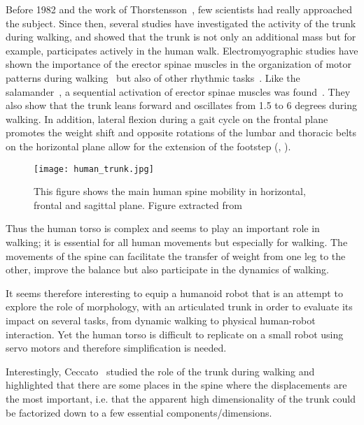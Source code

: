 Before 1982 and the work of Thorstensson~\parencite{thorstensson1982lumbar}, few scientists had really approached the subject. Since then, several studies have investigated the activity of the trunk during walking, and showed that the trunk is not only an additional mass but for example, participates actively in the human walk.
Electromyographic studies have shown the importance of the erector spinae muscles in the organization of motor patterns during walking~\parencite{anders2007trunk} but also of other rhythmic tasks~\parencite{de2008sequential}. Like the salamander~\parencite{ijspeert2007swimming}, a sequential activation of erector spinae muscles was found~\parencite{prince1994anticipatory}.
They also show that the trunk leans forward and oscillates from 1.5 to 6 degrees during walking. In addition, lateral flexion during a gait cycle on the frontal plane promotes the weight shift and opposite rotations of the lumbar and thoracic belts on the horizontal plane allow for the extension of the footstep (\cite{feipel2001three}, \cite{lamoth2006effects}).

\begin{figure}[ht]
    \begin{center}
        \texttt{[image: human\_trunk.jpg]}
    \end{center}
    \caption{This figure shows the main human spine mobility in horizontal, frontal and sagittal plane. Figure extracted from~\parencite{ceccatoPlos09}}
    \label{fig:human_spine_system}
\end{figure}

Thus the human torso is complex and seems to play an important role in walking; it is essential for all human movements but especially for walking. The movements of the spine can facilitate the transfer of weight from one leg to the other, improve the balance but also participate in the dynamics of walking.

It seems therefore interesting to equip a humanoid robot that is an attempt to explore the role of morphology, with an articulated trunk in order to evaluate its impact on several tasks, from dynamic walking to physical human-robot interaction. Yet the human torso is difficult to replicate on a small robot using servo motors and therefore simplification is needed.

Interestingly, Ceccato~\parencite{ceccatoPlos09} studied the role of the trunk during walking and highlighted that there are some places in the spine where the displacements are the most important, i.e. that the apparent high dimensionality of the trunk could be factorized down to a few essential components/dimensions.

